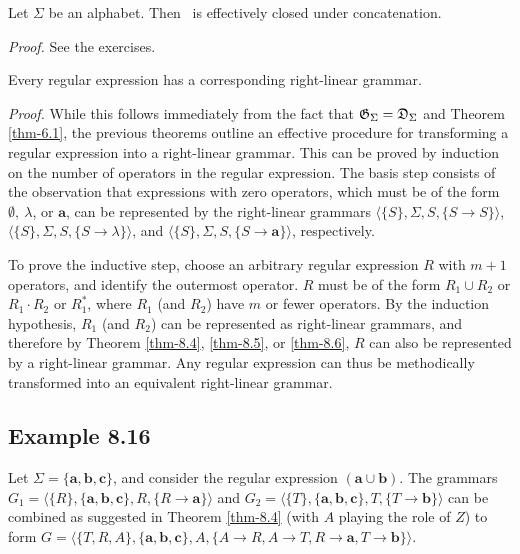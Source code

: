 \begin{thm}\label{thm-8.6}
Let $\Sigma$ be an alphabet. Then \GSIG\ is effectively closed under
concatenation.

\emph{Proof.} See the exercises.
\end{thm}

\begin{cor}\label{cor-8.2}
Every regular expression has a corresponding right-linear grammar.

\emph{Proof.} While this follows immediately from the fact that $\mathfrak{G}_\Sigma=\mathfrak{D}_\Sigma$
and Theorem \ref{thm-6.1}, the previous theorems outline an effective procedure for
transforming a regular expression into a right-linear grammar. This can be
proved by induction on the number of operators in the regular expression. The
basis step consists of the observation that expressions with zero operators,
which must be of the form $\emptyset,\ \lambda$, or $\pmb{a}$, can be represented
by the right-linear grammars $\langle\{S\},\Sigma,S,\{S\rightarrow S\}\rangle$,
$\langle\{S\},\Sigma,S,\{S\rightarrow\lambda\}\rangle$, and $\langle\{S\},\Sigma,
S,\{S\rightarrow\pmb{a}\}\rangle$, respectively.

To prove the inductive step, choose an arbitrary regular expression $R$ with
$m+1$ operators, and identify the outermost operator. $R$ must be of the form
$R_1\cup R_2$ or $R_1\cdot R_2$ or $R^*_1$, where $R_1$ (and $R_2$) have $m$ or
fewer operators. By the induction hypothesis, $R_1$ (and $R_2$) can be
represented as right-linear grammars, and therefore by Theorem \ref{thm-8.4}, \ref{thm-8.5}, or \ref{thm-8.6},
$R$ can also be represented by a right-linear grammar. Any regular expression
can thus be methodically transformed into an equivalent right-linear grammar.
\end{cor}

\subsection*{Example 8.16}

Let $\Sigma=\{\pmb{a},\pmb{b},\pmb{c}\}$, and consider the regular expression
$(\pmb{a}\cup\pmb{b})$. The grammars $G_1=\langle\{R\},\{\pmb{a},\pmb{b},\pmb{c}
\},R,\{R\rightarrow\pmb{a}\}\rangle$ and $G_2=\langle\{T\},\{\pmb{a},\pmb{b},
\pmb{c}\},T,\{T\rightarrow\pmb{b}\}\rangle$ can be combined as suggested in
Theorem \ref{thm-8.4} (with $A$ playing the role of $Z$) to form $G=\langle\{T,R,A\},\{
\pmb{a},\pmb{b},\pmb{c}\},A,\{A\rightarrow R,A\rightarrow T,R\rightarrow\pmb{a},
T\rightarrow\pmb{b}\}\rangle$.

